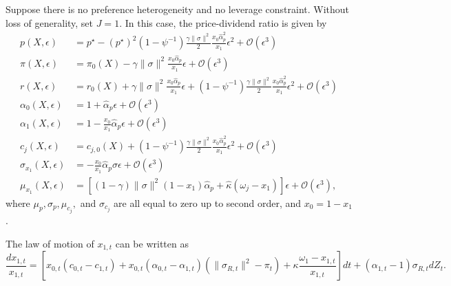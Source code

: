 Suppose there is no preference heterogeneity and no leverage constraint. Without loss of generality, set $J = 1$. In this case, the price-dividend ratio is given by
\begin{align}
    p(X,\epsilon) &= p^\star -(p^\star)^2 (1-\psi^{-1}) \frac{\gamma \|\sigma\|^2}{2} \frac{x_0 \hat{\alpha}_p^2}{x_1} \epsilon^2 + \mathcal{O}(\epsilon^3)\\
    \pi(X,\epsilon) &= \pi_0(X) - \gamma \|\sigma\|^2 \frac{x_0\hat{\alpha}_p}{x_1} \epsilon  + \mathcal{O}(\epsilon^3)\\
    r(X,\epsilon) &= r_0(X)+\gamma \|\sigma\|^2 \frac{x_0 \hat{\alpha}_p}{x_1} \epsilon +(1-\psi^{-1}) \frac{\gamma \|\sigma\|^2}{2} \frac{x_0 \hat{\alpha}_p^2}{x_1} \epsilon^2 + \mathcal{O}(\epsilon^3)\\
    \alpha_{0}(X,\epsilon) &= 1 + \hat{\alpha}_p\epsilon + \mathcal{O}(\epsilon^3)\\
    \alpha_{1}(X,\epsilon) &= 1 - \frac{x_0}{x_1} \hat{\alpha}_p\epsilon + \mathcal{O}(\epsilon^3)\\
    c_{j}(X,\epsilon) &= c_{j,0}(X) + (1-\psi^{-1}) \frac{\gamma \|\sigma\|^2}{2} \frac{x_0 \hat{\alpha}_p^2}{x_1} \epsilon^2 + \mathcal{O}(\epsilon^3)\\
    \sigma_{x_1}(X,\epsilon) &= - \frac{x_0}{x_1} \hat{\alpha}_p \sigma \epsilon  + \mathcal{O}(\epsilon^3)\\
    \mu_{x_1}(X,\epsilon) &= \left[ (1-\gamma) \|\sigma\|^2 (1-x_1) \hat{\alpha}_p + \hat{\kappa} (\omega_j - x_1)\right]  \epsilon + \mathcal{O}(\epsilon^3),
\end{align}
where $\mu_p, \sigma_p, \mu_{c_j},  $ and $\sigma_{c_j}$ are all equal to zero up to second order, and $x_0 = 1-x_1$.

The law of motion of $x_{1,t}$ can be written as
\begin{equation}
    \frac{d x_{1,t}}{x_{1,t}} = \left[ x_{0,t} (c_{0,t}-c_{1,t})+x_{0,t}(\alpha_{0,t}-\alpha_{1,t})\left( \|\sigma_{R,t}\|^2-\pi_t \right) 
 + \kappa\frac{\omega_1 - x_{1,t}}{x_{1,t}}\right] dt + (\alpha_{1,t}-1) \sigma_{R,t} d Z_t.
\end{equation}








